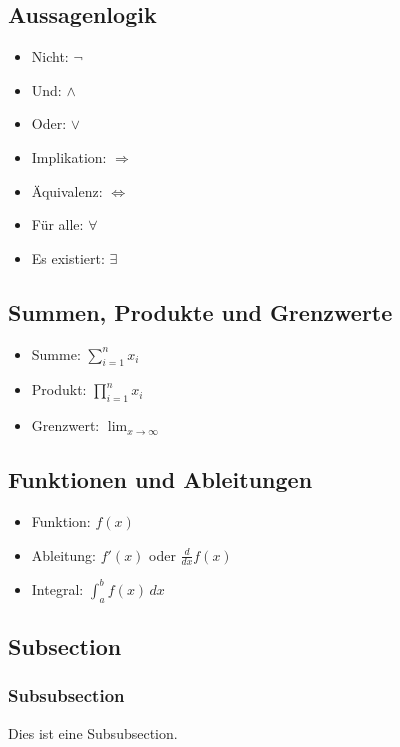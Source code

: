 \documentclass[a4paper,10pt]{article}
\begin{document}
\subsection{Aussagenlogik}
\begin{itemize}
    \item Nicht: $\neg$
    \item Und: $\wedge$
    \item Oder: $\vee$
    \item Implikation: $\Rightarrow$
    \item Äquivalenz: $\Leftrightarrow$
    \item Für alle: $\forall$
    \item Es existiert: $\exists$
\end{itemize}

\subsection{Summen, Produkte und Grenzwerte}
\begin{itemize}
    \item Summe: $\sum_{i=1}^{n} x_i$
    \item Produkt: $\prod_{i=1}^{n} x_i$
    \item Grenzwert: $\lim_{x \to \infty}$
\end{itemize}

\subsection{Funktionen und Ableitungen}
\begin{itemize}
    \item Funktion: $f(x)$
    \item Ableitung: $f'(x)$ oder $\frac{d}{dx} f(x)$
    \item Integral: $\int_{a}^{b} f(x) \,dx$
\end{itemize}




\subsection{Subsection}
\subsubsection{Subsubsection}
Dies ist eine Subsubsection.


\vfill
{}
\end{document}
